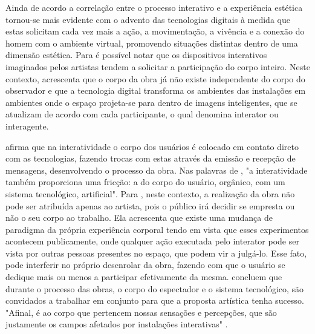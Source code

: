 Ainda de acordo  a correlação entre o processo interativo e a experiência estética tornou-se mais evidente com o advento das tecnologias digitais à medida que estas solicitam cada vez mais a ação, a movimentação, a vivência e a conexão do homem com o ambiente virtual, promovendo situações distintas dentro de uma dimensão estética. Para  é possível notar que os dispositivos interativos imaginados pelos artistas tendem a solicitar a participação do corpo inteiro. Neste contexto,  acrescenta que o corpo da obra já não existe independente do corpo do observador e que a tecnologia digital transforma os ambientes das instalações em ambientes onde o espaço projeta-se para dentro de imagens inteligentes, que se atualizam de acordo com cada participante, o qual denomina interator ou interagente.

 afirma que na interatividade o corpo dos usuários é colocado em contato direto com as tecnologias, fazendo trocas com estas através da emissão e recepção de mensagens, desenvolvendo o processo da obra. Nas palavras de , "a interatividade também proporciona uma fricção: a do corpo do usuário, orgânico, com um sistema tecnológico, artificial". Para , neste contexto, a realização da obra não pode ser atribuída apenas ao artista, pois o público irá decidir se empresta ou não o seu corpo ao trabalho. Ela acrescenta que existe uma mudança de paradigma da própria experiência corporal tendo em vista que esses experimentos acontecem publicamente, onde qualquer ação executada pelo interator pode ser vista por outras pessoas presentes no espaço, que podem vir a julgá-lo. Esse fato, pode interferir no próprio desenrolar da obra, fazendo com que o usuário se dedique mais ou menos a participar efetivamente da mesma.  concluem que durante o processo das obras, o corpo do espectador e o sistema tecnológico, são convidados a trabalhar em conjunto para que a proposta artística tenha sucesso. "Afinal, é ao corpo que pertencem nossas sensações e percepções, que são justamente os campos afetados por instalações interativas"  \cite[p. 199]{witt}.
